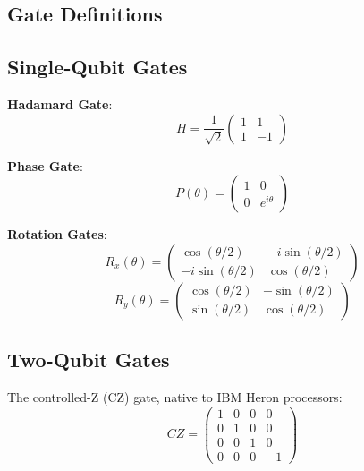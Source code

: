 \documentclass[pdflatex,sn-mathphys-num]{sn-jnl}
\begin{document}
\begin{appendices}

\section{Gate Definitions}
\label{app:gates}

\subsection{Single-Qubit Gates}

\textbf{Hadamard Gate}:
\begin{equation}
H = \frac{1}{\sqrt{2}} \begin{pmatrix} 1 & 1 \\ 1 & -1 \end{pmatrix}
\end{equation}

\textbf{Phase Gate}:
\begin{equation}
P(\theta) = \begin{pmatrix} 1 & 0 \\ 0 & e^{i\theta} \end{pmatrix}
\end{equation}

\textbf{Rotation Gates}:
\begin{equation}
R_x(\theta) = \begin{pmatrix} \cos(\theta/2) & -i\sin(\theta/2) \\ -i\sin(\theta/2) & \cos(\theta/2) \end{pmatrix}
\end{equation}
\begin{equation}
R_y(\theta) = \begin{pmatrix} \cos(\theta/2) & -\sin(\theta/2) \\ \sin(\theta/2) & \cos(\theta/2) \end{pmatrix}
\end{equation}

\subsection{Two-Qubit Gates}

The controlled-Z (CZ) gate, native to IBM Heron processors:
\begin{equation}
CZ = \begin{pmatrix} 1 & 0 & 0 & 0 \\ 0 & 1 & 0 & 0 \\ 0 & 0 & 1 & 0 \\ 0 & 0 & 0 & -1 \end{pmatrix}
\end{equation}


\end{appendices}
\end{document}
